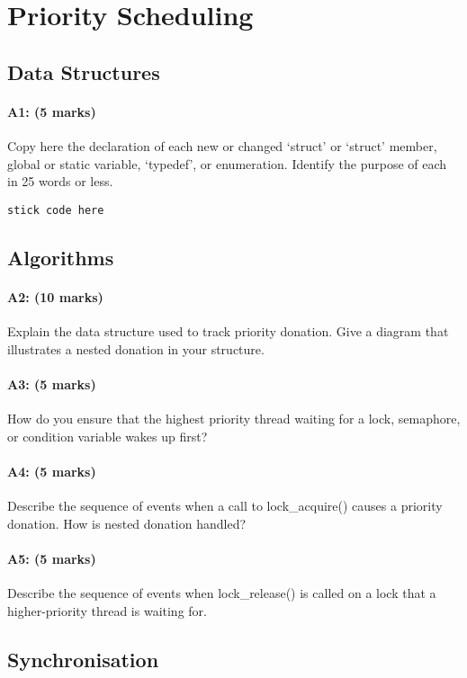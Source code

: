 \section{Priority Scheduling}
\subsection{Data Structures}
\paragraph{A1: (5 marks)}
Copy here the declaration of each new or changed `struct' or `struct' member, global or static variable, `typedef', or enumeration.  Identify the purpose of each in 25 words or less.

\begin{verbatim}
stick code here
\end{verbatim}

\subsection{Algorithms}
\paragraph{A2: (10 marks)}
Explain the data structure used to track priority donation. Give a diagram that illustrates a nested donation in your structure.

\paragraph{A3: (5 marks)}
How do you ensure that the highest priority thread waiting for a lock, semaphore, or condition variable wakes up first?

\paragraph{A4: (5 marks)}
Describe the sequence of events when a call to lock\_acquire() causes a priority donation.  How is nested donation handled?

\paragraph{A5: (5 marks)}
Describe the sequence of events when lock\_release() is called on a lock that a higher-priority thread is waiting for.

\subsection{Synchronisation}
